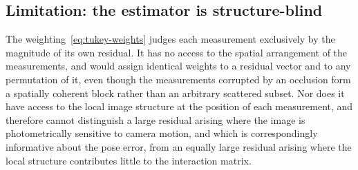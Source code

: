 %
%
%
%
%

\subsection{Limitation: the estimator is structure-blind}
\label{sec:tukey-limitation}

The weighting~\eqref{eq:tukey-weights} judges each measurement exclusively by
the magnitude of its own residual. It has no access to the spatial arrangement
of the measurements, and would assign identical weights to a residual vector
and to any permutation of it, even though the measurements corrupted by an
occlusion form a spatially coherent block rather than an arbitrary scattered
subset. Nor does it have access to the local image structure at the position
of each measurement, and therefore cannot distinguish a large residual arising
where the image is photometrically sensitive to camera motion, and which is
correspondingly informative about the pose error, from an equally large
residual arising where the local structure contributes little to the
interaction matrix.

